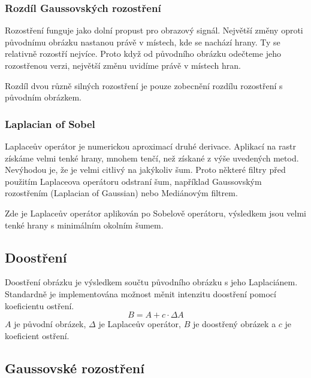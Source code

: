 \documentclass[11pt]{article}
\begin{document}
\subsubsection{Rozdíl Gaussovských rozostření}
Rozostření funguje jako dolní propust pro obrazový signál. Největší změny
oproti původnímu obrázku nastanou právě v místech, kde se nachází hrany. Ty se
relativně rozostří nejvíce. Proto když od původního obrázku odečteme jeho
rozostřenou verzi, největší změnu uvidíme právě v místech hran.

Rozdíl dvou různě silných rozostření je pouze zobecnění rozdílu rozostření s
původním obrázkem.

\subsubsection{Laplacian of Sobel}
Laplaceův operátor je numerickou aproximací druhé derivace. Aplikací na rastr
získáme velmi tenké hrany, mnohem tenčí, než získané z výše uvedených metod.
Nevýhodou je, že je velmi citlivý na jakýkoliv šum. Proto některé filtry před
použitím Laplaceova operátoru odstraní šum, například Gaussovským rozostřením
(Laplacian of Gaussian) nebo Mediánovým filtrem.

Zde je Laplaceův operátor aplikován po Sobelově operátoru, výsledkem jsou velmi
tenké hrany s minimálním okolním šumem.

\subsection{Doostření}
Doostření obrázku je výsledkem součtu původního obrázku s jeho Laplaciánem.
Standardně je implementována možnost měnit intenzitu doostření pomocí
koeficientu ostření. \\

$$
B = A + c \cdot \Delta A
$$
$A$ je původní obrázek, $\Delta$ je Laplaceův operátor, $B$ je doostřený
obrázek a $c$ je koeficient ostření.

\subsection{Gaussovské rozostření}
\end{document}
